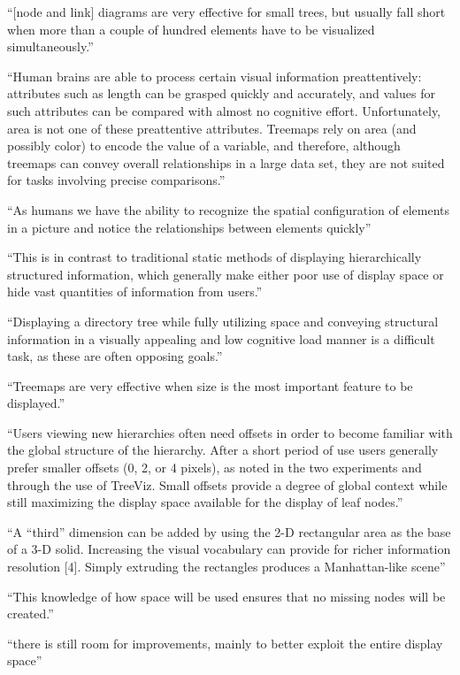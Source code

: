 

\enquote{[node and link] diagrams are very effective for small trees, but usually fall short when more than a couple of hundred elements have to be visualized simultaneously.}\cite[2]{bruls2000squarified}

\enquote{Human brains are able to process certain visual information preattentively: attributes such as length can be grasped quickly and accurately, and values for such attributes can be compared with almost no cognitive effort. Unfortunately, area is not one of these preattentive attributes. Treemaps rely on area (and possibly color) to encode the value of a variable, and therefore, although treemaps can convey overall relationships in a large data set, they are not suited for tasks involving precise comparisons.}\cite{laubheimer_2019}

\enquote{As humans we have the ability to recognize the spatial configuration of elements in a picture and notice the relationships between elements quickly}\cite[2]{johnson1998tree}

\enquote{This is in contrast to traditional static methods of displaying
hierarchically structured information, which generally make either poor use of
display space or hide vast quantities of information from users.}\cite[2]{johnson1998tree}

\enquote{Displaying a directory tree while fully utilizing space and conveying structural information in a visually appealing and low cognitive load manner is a difficult task, as these are often opposing goals.}\cite[8]{johnson1998tree}




\enquote{Treemaps are very effective when size is the most important feature to be displayed.}\cite[2]{bruls2000squarified}


\enquote{Users viewing new hierarchies often need offsets in order to become familiar with the global structure of the hierarchy. After a short period of use users generally prefer smaller offsets (0, 2, or 4 pixels), as noted in the two experiments and through the use of TreeViz. Small offsets provide a degree of global context while still maximizing the display space available for the display of leaf nodes.}\cite[3]{johnson1992improving}

\enquote{A “third” dimension can be added by using the 2-D rectangular area as the base of a 3-D solid. Increasing the visual vocabulary can provide for richer information resolution [4]. Simply extruding the rectangles produces a Manhattan-like scene}\cite[5]{johnson1992improving}


\enquote{This knowledge of how space will be used ensures that no missing nodes will be created.}\cite[6]{lu2008cascaded}

\enquote{there is still room for improvements, mainly to better exploit the entire display space}\cite[8]{visbasedlarge}